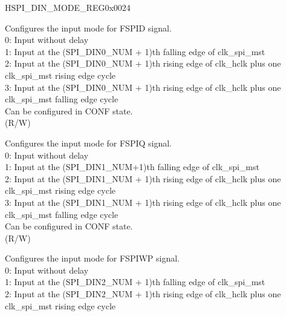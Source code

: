 \begin{register}{H}{SPI\_DIN\_MODE\_REG}{0x0024}\label{regdesc:SPIDINMODEREG}
%
%
%
%
%
%
%
%
%
%
\regnewline%
\begin{regdesc}\begin{reglist}
\label{fielddesc:SPIDIN0MODE}\item [SPI\_DIN0\_MODE] Configures the input mode for FSPID signal.\\
0: Input without delay\\
1: Input at the (SPI\_DIN0\_NUM + 1)th falling edge of clk\_spi\_mst\\
2: Input at the (SPI\_DIN0\_NUM + 1)th rising edge of clk\_hclk plus one clk\_spi\_mst rising edge cycle\\
3: Input at the (SPI\_DIN0\_NUM + 1)th rising edge of clk\_hclk plus one clk\_spi\_mst falling edge cycle\\
Can be configured in CONF state.\\ (R/W)
\label{fielddesc:SPIDIN1MODE}\item [SPI\_DIN1\_MODE] Configures the input mode for FSPIQ signal.\\
0: Input without delay\\
1: Input at the (SPI\_DIN1\_NUM+1)th falling edge of clk\_spi\_mst\\
2: Input at the (SPI\_DIN1\_NUM + 1)th rising edge of clk\_hclk plus one clk\_spi\_mst rising edge cycle\\
3: Input at the (SPI\_DIN1\_NUM + 1)th rising edge of clk\_hclk plus one clk\_spi\_mst falling edge cycle\\
    Can be configured in CONF state.\\ (R/W)
\label{fielddesc:SPIDIN2MODE}\item [SPI\_DIN2\_MODE] Configures the input mode for FSPIWP signal.\\
0: Input without delay\\
1: Input at the (SPI\_DIN2\_NUM + 1)th falling edge of clk\_spi\_mst\\
2: Input at the (SPI\_DIN2\_NUM + 1)th rising edge of clk\_hclk plus one clk\_spi\_mst rising edge cycle\\

\end{reglist}
\end{regdesc}
\end{register}
